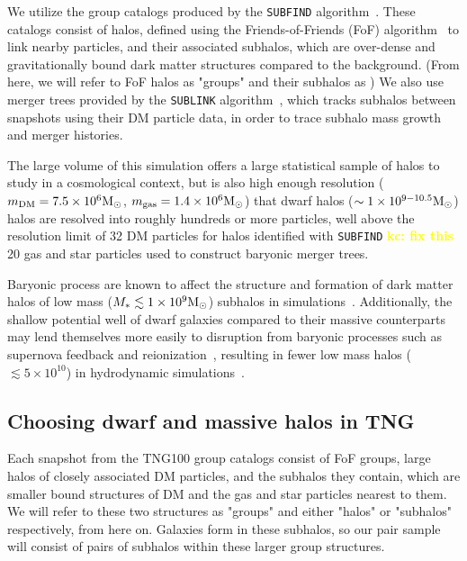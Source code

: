 \documentclass[twocolumn]{aastex631}
\newcommand{\kc}[1]{\textcolor{yellow}{\textbf{kc: #1}} }
\begin{document}
    We utilize the group catalogs produced by the \texttt{SUBFIND} algorithm~\citep{springel2001,dolag09}. 
    These catalogs consist of halos, defined using the Friends-of-Friends (FoF) algorithm~\citep{davis1985} to link nearby particles, and their associated subhalos, which are over-dense and gravitationally bound dark matter structures compared to the background. (From here, we will refer to FoF halos as "groups" and their subhalos as )
    We also use merger trees provided by the \texttt{SUBLINK} algorithm~\citep{rg15}, which tracks subhalos between snapshots using their DM particle data, in order to trace subhalo mass growth and merger histories.
    
    The large volume of this simulation offers a large statistical sample of halos to study in a cosmological context, but is also high enough resolution ($m_{\rm DM} = 7.5\times10^6\mathrm{M}_\odot$, $m_{\rm gas} = 1.4\times10^6\mathrm{M}_\odot$) that dwarf halos ($\sim1\times10^{9-10.5}\mathrm{M}_\odot$) halos are resolved into roughly hundreds or more particles, well above the resolution limit of 32 DM particles for halos identified with \texttt{SUBFIND} \kc{fix this} 20 gas and star particles used to construct baryonic merger trees.  

    Baryonic process are known to affect the structure and formation of dark matter halos of low mass ($M_*\lesssim 1\times10^9\mathrm{M}_\odot$) subhalos in simulations~\citep[see e.g.][and references therein]{Sales:2022}.
    Additionally, the shallow potential well of dwarf galaxies compared to their massive counterparts may lend themselves more easily to disruption from baryonic processes such as supernova feedback and reionization~\citep{}, resulting in fewer low mass halos ($\lesssim 5\times10^{10}$) in hydrodynamic simulations~\citep{vogelsberger14B}.

    \subsection{Choosing dwarf and massive halos in TNG} \label{sec:methods-halos}
    Each snapshot from the TNG100 group catalogs consist of FoF groups, large halos of closely associated DM particles, and the subhalos they contain, which are smaller bound structures of DM and the gas and star particles nearest to them. 
    We will refer to these two structures as "groups" and either "halos" or "subhalos" respectively, from here on. 
    Galaxies form in these subhalos, so our pair sample will consist of pairs of subhalos within these larger group structures.
\end{document}
